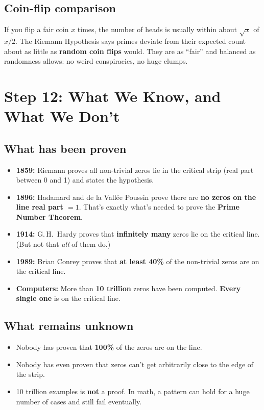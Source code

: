 \documentclass[11pt,a4paper]{article}
\begin{document}
\subsection*{Coin-flip comparison}

If you flip a fair coin $x$ times, the number of heads is usually within about $\sqrt{x}$ of $x/2$. The Riemann Hypothesis says primes deviate from their expected count about as little as \textbf{random coin flips} would. They are as ``fair'' and balanced as randomness allows: no weird conspiracies, no huge clumps.

\section{Step 12: What We Know, and What We Don't}

\subsection*{What has been proven}

\begin{itemize}[itemsep=2pt]
  \item \textbf{1859:} Riemann proves all non-trivial zeros lie in the critical strip (real part between 0 and 1) and states the hypothesis.
  \item \textbf{1896:} Hadamard and de la Vall\'ee Poussin prove there are \textbf{no zeros on the line real part $=1$}. That's exactly what's needed to prove the \textbf{Prime Number Theorem}.
  \item \textbf{1914:} G.\,H.\ Hardy proves that \textbf{infinitely many} zeros lie on the critical line. (But not that \emph{all} of them do.)
  \item \textbf{1989:} Brian Conrey proves that \textbf{at least 40\%} of the non-trivial zeros are on the critical line.
  \item \textbf{Computers:} More than \textbf{10 trillion} zeros have been computed. \textbf{Every single one} is on the critical line.
\end{itemize}

\subsection*{What remains unknown}

\begin{itemize}[itemsep=2pt]
  \item Nobody has proven that \textbf{100\%} of the zeros are on the line.
  \item Nobody has even proven that zeros can't get arbitrarily close to the edge of the strip.
  \item 10 trillion examples is \textbf{not} a proof. In math, a pattern can hold for a huge number of cases and still fail eventually.
\end{itemize}
\end{document}
